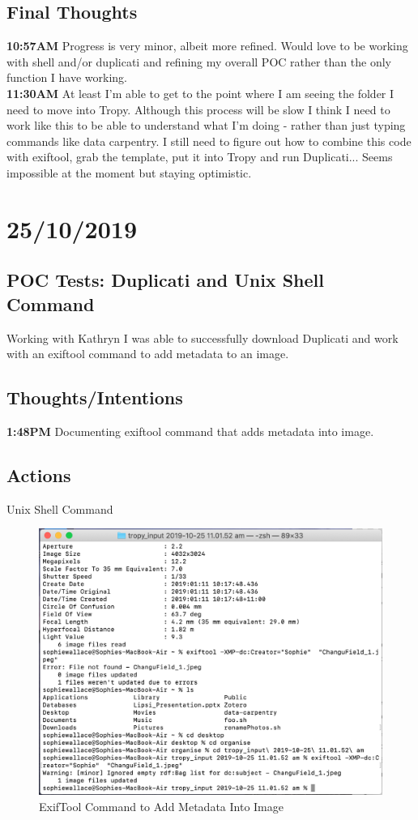 \documentclass{article}
\begin{document}
\subsection{Final Thoughts}
\textbf{10:57AM} Progress is very minor, albeit more refined. Would love to be working with shell and/or duplicati and refining my overall POC rather than the only function I have working. \\
\textbf{11:30AM} At least I'm able to get to the point where I am seeing the folder I need to move into Tropy. Although this process will be slow I think I need to work like this to be able to understand what I'm doing - rather than just typing commands like data carpentry. I still need to figure out how to combine this code with exiftool, grab the template, put it into Tropy and run Duplicati... Seems impossible at the moment but staying optimistic.

\section{25/10/2019}
\subsection{POC Tests: Duplicati and Unix Shell Command}
Working with Kathryn I was able to successfully download Duplicati and work with an exiftool command to add metadata to an image.
\subsection{Thoughts/Intentions}
\textbf{1:48PM} Documenting exiftool command that adds metadata into image.

\subsection{Actions}
Unix Shell Command
\begin{figure}[H]
    \centering
    \includegraphics[width=\textwidth]{Images/Exiftool_3.png}
    \caption{ExifTool Command to Add Metadata Into Image}
    \label{fig:my_label}
\end{figure}
\end{document}
